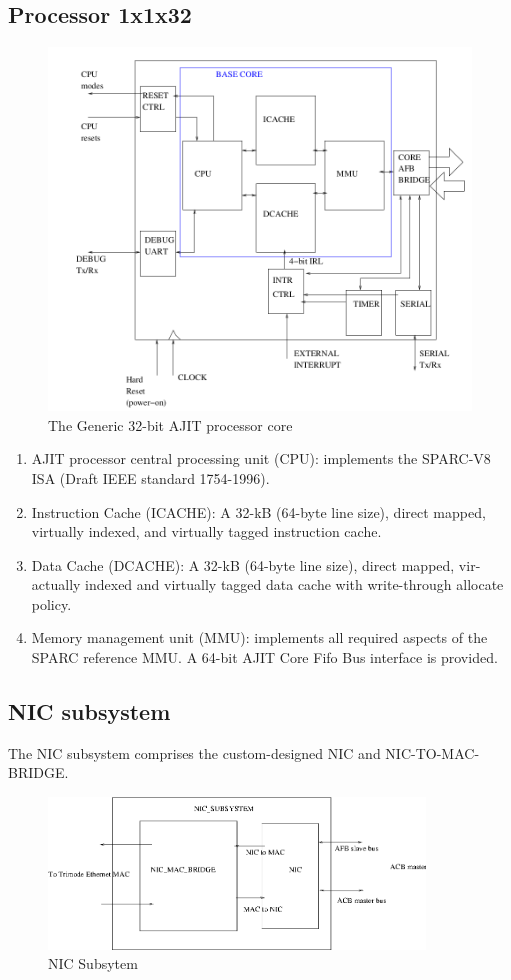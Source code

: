 \documentclass[12pt]{report}
\begin{document}
\subsection{Processor 1x1x32}
\begin{figure}[h]
			\centering
			\includegraphics[width=12cm]{../figures/proc.png}
			\caption{The Generic 32-bit AJIT processor core}
			
		\end{figure}
\begin{enumerate}
    \item AJIT processor central processing unit (CPU): implements the SPARC-V8
ISA (Draft IEEE standard 1754-1996).
\item  Instruction Cache (ICACHE): A 32-kB (64-byte line size), direct mapped,
virtually indexed, and virtually tagged instruction cache.
\item Data Cache (DCACHE): A 32-kB (64-byte line size), direct mapped, vir-
actually indexed and virtually tagged data cache with write-through allocate
policy.
\item  Memory management unit (MMU): implements all required aspects of the
SPARC reference MMU. A 64-bit AJIT Core Fifo Bus interface is provided.

\end{enumerate}

\subsection{NIC subsystem}
The NIC subsystem comprises the custom-designed NIC and NIC-TO-MAC-BRIDGE.
\begin{figure}[h]
			\centering
			\includegraphics[width=10cm]{../figures/NIC_SUBSYSTEM.jpg}
			\caption{NIC Subsytem}
		\end{figure}
\end{document}
